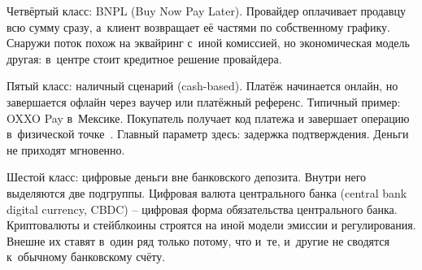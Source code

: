 Четвёртый класс: BNPL (Buy Now Pay Later). Провайдер оплачивает
продавцу всю сумму сразу, а~клиент возвращает её частями по
собственному графику. Снаружи поток похож на эквайринг с~иной
комиссией, но экономическая модель другая: в~центре стоит
кредитное решение провайдера.

Пятый класс: наличный сценарий (cash-based). Платёж начинается
онлайн, но завершается офлайн через ваучер или платёжный референс.
Типичный пример: OXXO Pay в~Мексике. Покупатель получает код
платежа и завершает операцию в~физической точке~\cite{oxxo-pay}.
Главный параметр здесь: задержка подтверждения. Деньги не приходят
мгновенно.

Шестой класс: цифровые деньги вне банковского депозита. Внутри него
выделяются две подгруппы. Цифровая валюта центрального
банка (central bank digital currency, CBDC) -- цифровая форма
обязательства центрального банка. Криптовалюты и стейблкоины
строятся на иной модели эмиссии и регулирования. Внешне их ставят
в~один ряд только потому, что и~те, и~другие не сводятся
к~обычному банковскому счёту.

